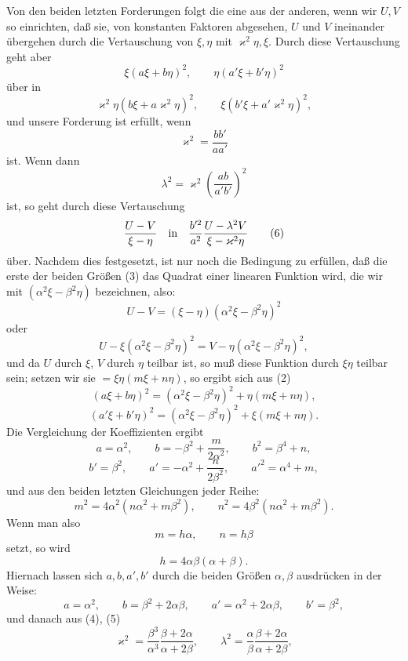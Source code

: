 \documentclass[11pt]{article}
\begin{document}
Von den beiden letzten Forderungen folgt die eine aus der anderen, wenn wir $U,V$ so einrichten, daß sie, von konstanten Faktoren abgesehen, $U$ und $V$ ineinander übergehen durch die Vertauschung von $\xi,\eta$ mit $\varkappa^2\eta,\xi$. Durch diese Vertauschung geht aber
\[
\xi(a\xi+b\eta)^2,\qquad \eta(a'\xi+b'\eta)^2
\]
über in
\[
\varkappa^2\eta(b\xi+a\varkappa^2\eta)^2,\qquad
\xi(b'\xi+a'\varkappa^2\eta)^2,
\]
und unsere Forderung ist erfüllt, wenn
\begin{equation}
\varkappa^2=\frac{bb'}{aa'}
\tag{4}
\end{equation}
ist. Wenn dann
\begin{equation}
\lambda^2=\varkappa^2\left(\frac{ab}{a'b'}\right)^2
\tag{5}
\end{equation}
ist, so geht durch diese Vertauschung
\begin{equation}
\frac{U-V}{\xi-\eta}\quad\hbox{in}\quad
\frac{b'^2}{a^2}\frac{U-\lambda^2V}{\xi-\varkappa^2\eta}
\tag{6}
\end{equation}
über. Nachdem dies festgesetzt, ist nur noch die Bedingung zu erfüllen, daß die erste der beiden Größen (3) das Quadrat einer linearen Funktion wird, die wir mit $(\alpha^2\xi-\beta^2\eta)$ bezeichnen, also:
\begin{equation}
U-V=(\xi-\eta)(\alpha^2\xi-\beta^2\eta)^2
\tag{7}
\end{equation}
oder
\[
U-\xi(\alpha^2\xi-\beta^2\eta)^2
=
V-\eta(\alpha^2\xi-\beta^2\eta)^2,
\]
und da $U$ durch $\xi$, $V$ durch $\eta$ teilbar ist, so muß diese Funktion durch $\xi\eta$ teilbar sein; setzen wir sie $=\xi\eta(m\xi+n\eta)$, so ergibt sich aus (2)
\[
(a\xi+b\eta)^2=(\alpha^2\xi-\beta^2\eta)^2+\eta(m\xi+n\eta),
\]
\[
(a'\xi+b'\eta)^2=(\alpha^2\xi-\beta^2\eta)^2+\xi(m\xi+n\eta).
\]
Die Vergleichung der Koeffizienten ergibt
\[
a=\alpha^2,\qquad b=-\beta^2+\frac{m}{2\alpha^2},\qquad b^2=\beta^4+n,
\]
\[
b'=\beta^2,\qquad a'=-\alpha^2+\frac{n}{2\beta^2},\qquad a'^2=\alpha^4+m,
\]
und aus den beiden letzten Gleichungen jeder Reihe:
\[
m^2=4\alpha^2(n\alpha^2+m\beta^2),\qquad
n^2=4\beta^2(n\alpha^2+m\beta^2).
\]
Wenn man also
\[
m=h\alpha,\qquad n=h\beta
\]
setzt, so wird
\[
h=4\alpha\beta(\alpha+\beta).
\]
Hiernach lassen sich $a,b,a',b'$ durch die beiden Größen $\alpha,\beta$ ausdrücken in der Weise:
\begin{equation}
a=\alpha^2,\qquad b=\beta^2+2\alpha\beta,\qquad
a'=\alpha^2+2\alpha\beta,\qquad b'=\beta^2,
\tag{8}
\end{equation}
und danach aus (4), (5)
\begin{equation}
\varkappa^2=\frac{\beta^3}{\alpha^3}\frac{\beta+2\alpha}{\alpha+2\beta},
\qquad
\lambda^2=\frac{\alpha}{\beta}\frac{\beta+2\alpha}{\alpha+2\beta},
\tag{9}
\end{equation}
\end{document}
